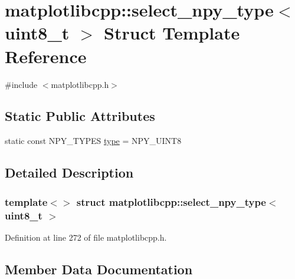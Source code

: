\hypertarget{structmatplotlibcpp_1_1select__npy__type_3_01uint8__t_01_4}{}\section{matplotlibcpp\+::select\+\_\+npy\+\_\+type$<$ uint8\+\_\+t $>$ Struct Template Reference}
\label{structmatplotlibcpp_1_1select__npy__type_3_01uint8__t_01_4}


{\ttfamily \#include $<$matplotlibcpp.\+h$>$}

\subsection*{Static Public Attributes}
\begin{DoxyCompactItemize}
\item 
static const N\+P\+Y\+\_\+\+T\+Y\+P\+ES \mbox{\hyperlink{structmatplotlibcpp_1_1select__npy__type_3_01uint8__t_01_4_a6e80bfd252a69f14ff869c8b4fbb9e54}{type}} = N\+P\+Y\+\_\+\+U\+I\+N\+T8
\end{DoxyCompactItemize}


\subsection{Detailed Description}
\subsubsection*{template$<$$>$\newline
struct matplotlibcpp\+::select\+\_\+npy\+\_\+type$<$ uint8\+\_\+t $>$}



Definition at line 272 of file matplotlibcpp.\+h.



\subsection{Member Data Documentation}
\mbox{\label{structmatplotlibcpp_1_1select__npy__type_3_01uint8__t_01_4_a6e80bfd252a69f14ff869c8b4fbb9e54}} 
